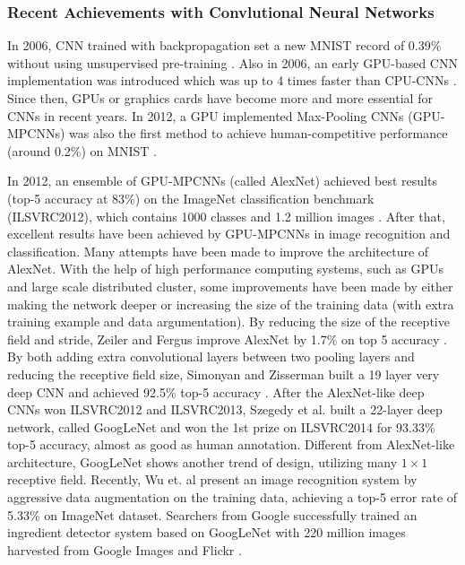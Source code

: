 \subsubsection{Recent Achievements with Convlutional Neural Networks}
In 2006, CNN trained with backpropagation set a new MNIST record of 0.39\% without using unsupervised pre-training \cite{marc2006efficient}. Also in 2006, an early GPU-based CNN implementation was introduced which was up to 4 times faster than CPU-CNNs \cite{chellapilla2006high}. Since then, GPUs or graphics cards have become more and more essential for CNNs in recent years. In 2012, a GPU implemented Max-Pooling CNNs (GPU-MPCNNs) was also the first method to achieve human-competitive performance (around 0.2\%) on MNIST \cite{ciresan2012multi}.

In 2012, an ensemble of GPU-MPCNNs (called AlexNet) achieved best results (top-5 accuracy at 83\%) on the ImageNet classification benchmark (ILSVRC2012), which contains 1000 classes and 1.2 million images \cite{krizhevsky2012imagenet}. After that, excellent results have been achieved by GPU-MPCNNs in image recognition and classification. Many attempts have been made to improve the architecture of AlexNet. With the help of high performance computing systems, such as GPUs and large scale distributed cluster, some improvements have been made by either making the network deeper or increasing the size of the training data  (with extra training example and data argumentation). By reducing the size of the receptive field and stride, Zeiler and Fergus improve AlexNet by 1.7\% on top 5 accuracy \cite{zeiler2014visualizing}. By both adding extra convolutional layers between two pooling layers and reducing the receptive field size, Simonyan and Zisserman built a 19 layer very deep CNN and achieved 92.5\% top-5 accuracy \cite{simonyan2014very}. After the AlexNet-like deep CNNs won ILSVRC2012 and ILSVRC2013, Szegedy et al. built a 22-layer deep network, called GoogLeNet and won the 1st prize on ILSVRC2014 for 93.33\% top-5 accuracy, almost as good as human annotation\cite{szegedy2014going}. Different from AlexNet-like architecture, GoogLeNet shows another trend of design, utilizing many $1\times 1$ receptive field. Recently, Wu et. al present an image recognition system by aggressive data augmentation on the training data, achieving a top-5 error rate of 5.33\% on ImageNet dataset\cite{wu2015deep}. Searchers from Google successfully trained an ingredient detector system based on GoogLeNet with 220 million images harvested from Google Images and Flickr \cite{malmaud2015s}.  

